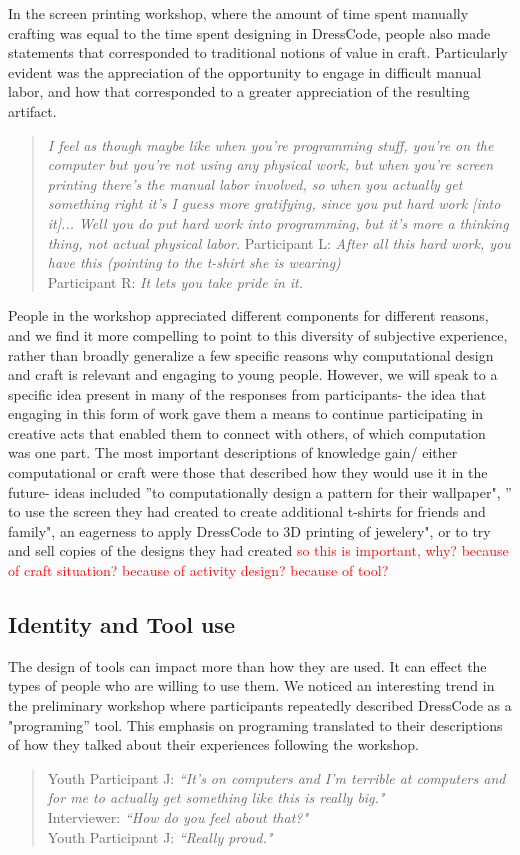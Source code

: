 \documentclass{sigchi}
\begin{document}
In the screen printing workshop, where the amount of time spent manually crafting was equal to the time spent designing in DressCode, people also made statements that corresponded to traditional notions of value in craft. Particularly evident was the appreciation of the opportunity to engage in difficult manual labor, and how that corresponded to a greater appreciation of the resulting artifact.
\begin{quotation}
\textit{I feel as though maybe like when you're programming stuff, you're on the computer but you're not using any physical work, but when you're screen printing there's the manual labor involved, so when you actually get something right it's I guess more gratifying, since you put hard work [into it]... Well you do put hard work into programming, but it's more a thinking thing, not actual physical labor.}
Participant L: \textit{After all this hard work, you have this (pointing to the t-shirt she is wearing)}
\\Participant R: \textit{It lets you take pride in it.}
\end{quotation}

People in the workshop appreciated different components for different reasons, and we find it more compelling to point to this diversity of subjective experience, rather than broadly generalize a few specific reasons why computational design and craft is relevant and engaging to young people. However, we will speak to a specific idea present in many of the responses from participants- the idea that engaging in this form of work gave them a means to continue participating in creative acts that enabled them to connect with others, of which computation was one part. The most important descriptions of knowledge gain/ either computational or craft were those that described how they would use it in the future- ideas included ''to computationally design a pattern for their wallpaper", '' to use the screen they had created to create additional t-shirts for friends and family", an eagerness to apply DressCode to 3D printing of jewelery", or to try and sell copies of the designs they had created
\textcolor{red}{so this is important, why? because of craft situation? because of activity design? because of tool?}


\subsection{Identity and Tool use}
 The design of tools can impact more than how they are used. It can effect the types of people who are willing to use them. We noticed an interesting trend in the preliminary workshop where participants repeatedly described DressCode as a "programing'' tool. This emphasis on programing translated to their descriptions of how they talked about their experiences following the workshop.
 \begin{quotation}
Youth Participant J: \textit{``It's on computers and I'm terrible at computers and for me to actually get something like this is really big."} 
\\Interviewer:  \textit{``How do you feel about that?"}
\\Youth Participant J:  \textit{``Really proud."} 
\end{quotation}
\end{document}

